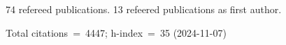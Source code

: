 74 refereed publications. 13 refeered publications as first author.

Total citations~=~4447; h-index~=~35 (2024-11-07)